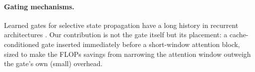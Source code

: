 \paragraph{Gating mechanisms.} Learned gates for selective state propagation
have a long history in recurrent architectures
\cite{obiora2019gating,marasovic2024gated}. Our contribution is not the gate
itself but its placement: a cache-conditioned gate inserted immediately
before a short-window attention block, sized to make the FLOPs savings from
narrowing the attention window outweigh the gate's own (small) overhead.
